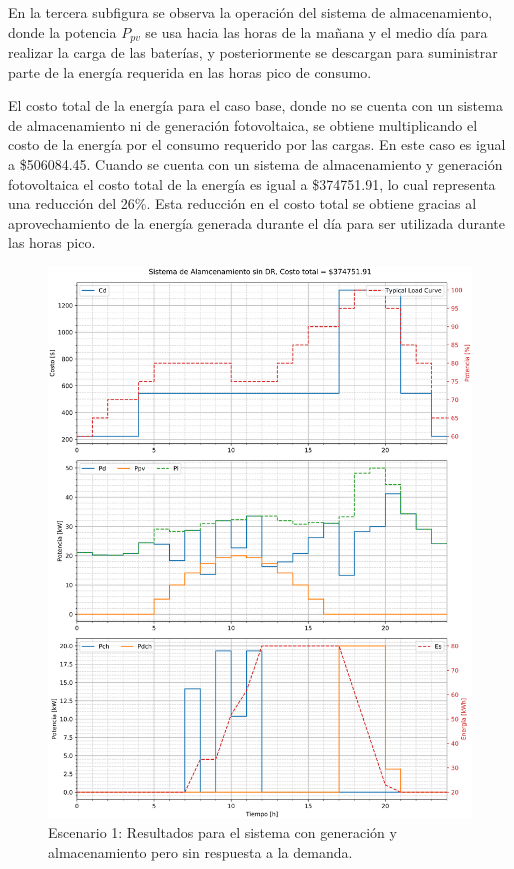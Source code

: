 En la tercera subfigura se observa la operación del sistema de almacenamiento, donde la potencia $P_{pv}$ se usa hacia las horas de la mañana y el medio día para realizar la carga de las baterías, y posteriormente se descargan para suministrar parte de la energía requerida en las horas pico de consumo.

El costo total de la energía para el caso base, donde no se cuenta con un sistema de almacenamiento ni de generación fotovoltaica, se obtiene multiplicando el costo de la energía por el consumo requerido por las cargas. En este caso es igual a \$506084.45. Cuando se cuenta con un sistema de almacenamiento y generación fotovoltaica el costo total de la energía es igual a \$374751.91, lo cual representa una reducción del 26\%. Esta reducción en el costo total se obtiene gracias al aprovechamiento de la energía generada durante el día para ser utilizada durante las horas pico.

\begin{figure}
	\centering
	\includegraphics[width=16cm]{img/escenario1.eps}
	\caption{Escenario 1: Resultados para el sistema con generación y almacenamiento pero sin respuesta a la demanda.}
	\label{fig:escenario1}
\end{figure}

